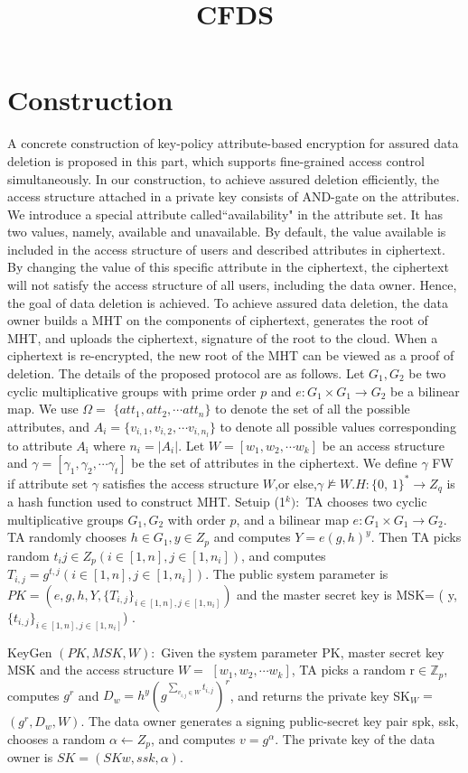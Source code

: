 \documentclass[runningheads]{llncs}
\begin{document}
\title{CFDS}

\section{Construction}
A concrete construction of key-policy attribute-based encryption for assured data deletion is proposed in this part, which supports fine-grained access control simultaneously. In our construction, to achieve assured deletion efficiently, the access structure attached in a private key consists of AND-gate on the attributes. We introduce a special attribute called“availability" in the attribute set. It has two values, namely, available and unavailable. By default, the value available is included in the access structure of users and described attributes in ciphertext. By changing the value of this specific attribute in the ciphertext, the ciphertext will not satisfy the access structure of all users, including the data owner. Hence, the goal of data deletion is achieved. To achieve assured data deletion, the data owner builds a MHT on the components of ciphertext, generates the root of MHT, and uploads the ciphertext, signature of the root to the cloud. When a ciphertext is re-encrypted, the new root of the MHT can be viewed as a proof of deletion. The details of the proposed protocol are as follows.
Let $G_1,G_2$ be two cyclic multiplicative groups with prime order $p$ and $e:G_1\times G_1\to G_2$ be a bilinear map. We use $\Omega=$ $\{att_1,att_2,\cdots att_n\}$ to denote the set of all the possible attributes, and $A_i=\{v_{i,1},v_{i,2},\cdots v_{i,n_l}\}$ to denote all possible values corresponding to attribute $A_{\mathrm{i}}$ where $n_i=|A_i|.$ Let $W=[w_1,w_2,\cdots w_k]$ be an access structure and $\gamma=[\gamma_1,\gamma_2,\cdots\gamma_t]$ be the set of attributes in the ciphertext. We define $\gamma$ FW if attribute set $\gamma$ satisfies the access structure $W$,or else,$\gamma\not\models W.H:\{0$, $1\}^*\to Z_q$ is a hash function used to construct MHT.
Setuip (1$^k):$ TA chooses two cyclic multiplicative groups $G_1,G_2$ with order $p$, and a bilinear map $e:G_1\times G_1\to G_2.$ TA randomly chooses $h\in G_1,y\in Z_p$ and computes $Y=e(g,h)^y.$ Then TA picks random $t_ij\in Z_p(i\in[1,n],j\in[1,n_i])$, and computes $T_{i,j}=g^{t,j}(i\in[1,n],j\in[1,n_{i}]).$ The public system parameter is $PK=(e,g,h,Y,\{T_{i,j}\}_{i\in[1,n],j\in[1,n_{i}]})$ and the master secret key is MSK= ( y, $\{ t_{i, j}\} _{i\in [ 1, n] , j\in [ 1, n_{i}] }$) .

KeyGen $(PK,MSK,W){:}$ Given the system parameter PK, master secret key MSK and the access structure $W=$ $[w_1,w_2,\cdots w_k]$, TA picks a random r$\in\mathbb{Z}_p$, computes $g^r$ and $D_w=h^y(g^{\sum_{v_{i,j}\in W}t_{i,j}})^r$, and returns the private key SK$_W=$ $(g^r,D_w,W).$ The data owner generates a signing public-secret key pair {spk, ssk}, chooses a random $\alpha\leftarrow Z_p$, and computes $v=g^{\alpha}.$ The private key of the data owner is $SK=(SKw,ssk,\alpha)$.
\end{document}
